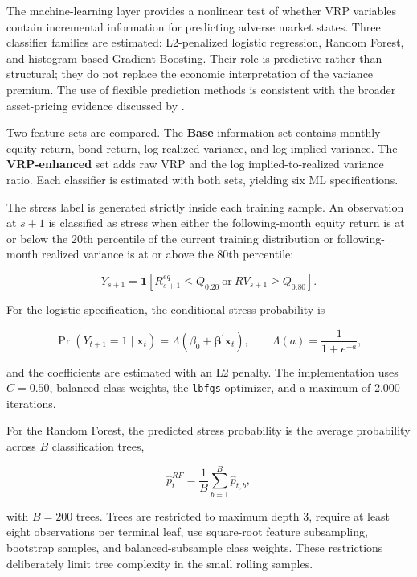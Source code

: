 The machine-learning layer provides a nonlinear test of whether VRP variables contain
incremental information for predicting adverse market states. Three classifier families are
estimated: L2-penalized logistic regression, Random Forest, and histogram-based Gradient
Boosting. Their role is predictive rather than structural; they do not replace the economic
interpretation of the variance premium. The use of flexible prediction methods is consistent
with the broader asset-pricing evidence discussed by \textcite{GuKellyXiu2020}.

Two feature sets are compared. The \textbf{Base} information set contains monthly equity return,
bond return, log realized variance, and log implied variance. The \textbf{VRP-enhanced} set adds
raw VRP and the log implied-to-realized variance ratio. Each classifier is estimated with both
sets, yielding six ML specifications.

The stress label is generated strictly inside each training sample. An observation at $s+1$ is
classified as stress when either the following-month equity return is at or below the 20th
percentile of the current training distribution or following-month realized variance is at or above
the 80th percentile:

\begin{equation}
Y_{s+1}
=
\mathbf{1}
\left[
R^{eq}_{s+1}
\leq
Q_{0.20}
\ \text{or}\
RV_{s+1}
\geq
Q_{0.80}
\right].
\end{equation}

For the logistic specification, the conditional stress probability is

\begin{equation}
\Pr
\left(
Y_{t+1}=1
\mid
\mathbf{x}_t
\right)
=
\Lambda
\left(
\beta_0
+
\boldsymbol{\beta}^{\prime}
\mathbf{x}_t
\right),
\qquad
\Lambda(a)
=
\frac{1}{1+e^{-a}},
\end{equation}

and the coefficients are estimated with an L2 penalty. The implementation uses
$C=0.50$, balanced class weights, the \texttt{lbfgs} optimizer, and a maximum of 2,000
iterations.

For the Random Forest, the predicted stress probability is the average probability across
$B$ classification trees,

\begin{equation}
\widehat{p}_t^{RF}
=
\frac{1}{B}
\sum_{b=1}^{B}
\widehat{p}_{t,b},
\end{equation}

with $B=200$ trees. Trees are restricted to maximum depth 3, require at least eight
observations per terminal leaf, use square-root feature subsampling, bootstrap samples, and
balanced-subsample class weights. These restrictions deliberately limit tree complexity in the
small rolling samples.

